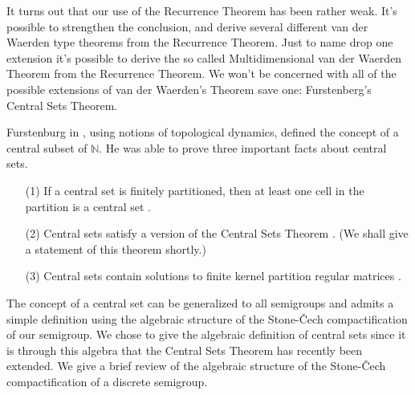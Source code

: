 \documentclass[12pt]{article}
\theoremstyle{plain}
\theoremstyle{definition}
\newcommand{\bbN}{\mathbb{N}}
\begin{document}
It turns out that our use of the Recurrence Theorem has been rather
weak.
It's possible to strengthen the conclusion, and derive several
different van der Waerden type
theorems from the Recurrence Theorem.
Just to name drop one extension it's possible to derive the
so called Multidimensional van der Waerden Theorem from the
Recurrence Theorem.%
We won't be concerned with all of the possible extensions of van
der Waerden's Theorem save one: Furstenberg's Central Sets Theorem.

Furstenburg in \cite[Chapter 8]{Furstenberg:1981fk}, using notions of
topological dynamics, defined the concept of a central subset of
$\bbN$.
He was able to prove three important facts about central sets.
  \begin{itemize}
    \item[(1)] If a central set is finitely partitioned, then at least
      one cell in the partition is a central set 
      \cite[Theorem 8.8, page 161]{Furstenberg:1981fk}.
    \item[(2)] Central sets satisfy a version of the Central Sets
      Theorem \cite[Theorem 8.21]{Furstenberg:1981fk}.
      (We shall give a statement of this theorem shortly.)
    \item[(3)] Central sets contain solutions to finite kernel
      partition regular matrices \cite[Theorem 8.22, page
      172]{Furstenberg:1981fk}. 
  \end{itemize}

The concept of a central set can be generalized to all semigroups and
admits a simple definition using the algebraic structure of the
Stone-\v{C}ech compactification of our semigroup. 
We chose to give the algebraic definition of central sets since it is
through this algebra that the Central Sets Theorem has recently been
extended.
We give a brief review of the algebraic structure of the
Stone-\v{C}ech compactification of a discrete semigroup.

\end{document}

